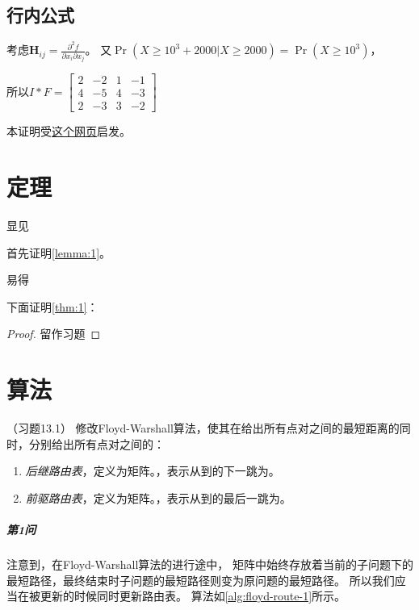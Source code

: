 \documentclass{dreamClass}
\begin{document}
\subsection{行内公式}
考虑\(\mathbf{H}_{i j}=\frac{\partial^{2} f}{\partial x_{i} \partial x_{j}}\)。
又\(\operatorname{Pr}(X \geq 10^3 + 2000 | X \geq 2000) = \operatorname{Pr}(X \geq 10^3)\)，

所以\(I * F = \begin{bmatrix}
    2 & -2  & 1 & - 1 \\
    4 & - 5 & 4 & - 3 \\
    2 & - 3 & 3 & - 2
\end{bmatrix}\)

本证明受\href{https://datawhalechina.github.io/pumpkin-book/#/chapter2/chapter2?id=221}{这个网页}启发。

\section{定理}
\begin{theorem}\label{thm:1}
    显见
\end{theorem}

首先证明\cref{lemma:1}。
\begin{lemma}\label{lemma:1}
    易得
\end{lemma}

下面证明\cref{thm:1}：
\begin{proof}
    留作习题
\end{proof}


\section{算法}
\begin{problem}（习题13.1）
修改Floyd-Warshall算法，使其在给出所有点对之间的最短距离的同时，分别给出所有点对之间的：
\begin{enumerate}
    \item \emph{后继路由表}，定义为矩阵。，表示从到的下一跳为。
    \item \emph{前驱路由表}，定义为矩阵。，表示从到的最后一跳为。
\end{enumerate}
\end{problem}

\subparagraph*{第1问}
注意到，在Floyd-Warshall算法的进行途中，
矩阵中始终存放着当前的子问题下的最短路径，最终结束时子问题的最短路径则变为原问题的最短路径。
所以我们应当在被更新的时候同时更新路由表。
算法如\cref{alg:floyd-route-1}所示。
\end{document}
